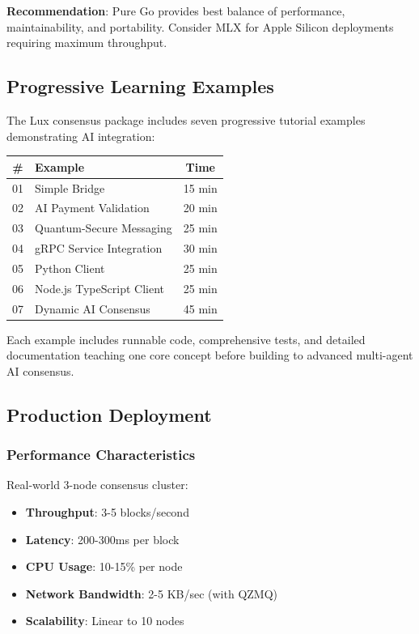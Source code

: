 \textbf{Recommendation}: Pure Go provides best balance of performance, maintainability, and portability. Consider MLX for Apple Silicon deployments requiring maximum throughput.

\subsection{Progressive Learning Examples}

The Lux consensus package includes seven progressive tutorial examples demonstrating AI integration:

\begin{center}
\begin{tabular}{clc}
\toprule
\textbf{\#} & \textbf{Example} & \textbf{Time} \\
\midrule
01 & Simple Bridge & 15 min \\
02 & AI Payment Validation & 20 min \\
03 & Quantum-Secure Messaging & 25 min \\
04 & gRPC Service Integration & 30 min \\
05 & Python Client & 25 min \\
06 & Node.js TypeScript Client & 25 min \\
07 & Dynamic AI Consensus & 45 min \\
\bottomrule
\end{tabular}
\end{center}

Each example includes runnable code, comprehensive tests, and detailed documentation teaching one core concept before building to advanced multi-agent AI consensus.

\subsection{Production Deployment}

\subsubsection{Performance Characteristics}

Real-world 3-node consensus cluster:

\begin{itemize}
\item \textbf{Throughput}: 3-5 blocks/second
\item \textbf{Latency}: 200-300ms per block
\item \textbf{CPU Usage}: 10-15\% per node
\item \textbf{Network Bandwidth}: 2-5 KB/sec (with QZMQ)
\item \textbf{Scalability}: Linear to 10 nodes
\end{itemize}

